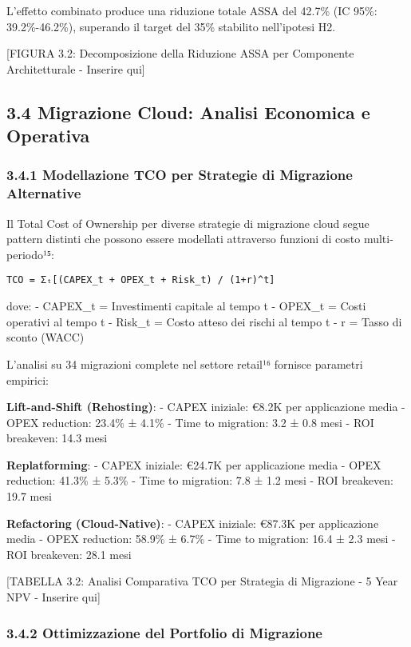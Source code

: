 \documentclass{report}
\begin{document}
L'effetto combinato produce una riduzione totale ASSA del 42.7\% (IC
95\%: 39.2\%-46.2\%), superando il target del 35\% stabilito
nell'ipotesi H2.

{[}FIGURA 3.2: Decomposizione della Riduzione ASSA per Componente
Architetturale - Inserire qui{]}

\subsection{3.4 Migrazione Cloud: Analisi Economica e
Operativa}\label{migrazione-cloud-analisi-economica-e-operativa}

\subsubsection{3.4.1 Modellazione TCO per Strategie di Migrazione
Alternative}\label{modellazione-tco-per-strategie-di-migrazione-alternative}

Il Total Cost of Ownership per diverse strategie di migrazione cloud
segue pattern distinti che possono essere modellati attraverso funzioni
di costo multi-periodo¹⁵:

\begin{verbatim}
TCO = Σₜ[(CAPEX_t + OPEX_t + Risk_t) / (1+r)^t]
\end{verbatim}

dove: - CAPEX\_t = Investimenti capitale al tempo t - OPEX\_t = Costi
operativi al tempo t - Risk\_t = Costo atteso dei rischi al tempo t - r
= Tasso di sconto (WACC)

L'analisi su 34 migrazioni complete nel settore retail¹⁶ fornisce
parametri empirici:

\textbf{Lift-and-Shift (Rehosting)}: - CAPEX iniziale: €8.2K per
applicazione media - OPEX reduction: 23.4\% ± 4.1\% - Time to migration:
3.2 ± 0.8 mesi - ROI breakeven: 14.3 mesi

\textbf{Replatforming}: - CAPEX iniziale: €24.7K per applicazione media
- OPEX reduction: 41.3\% ± 5.3\% - Time to migration: 7.8 ± 1.2 mesi -
ROI breakeven: 19.7 mesi

\textbf{Refactoring (Cloud-Native)}: - CAPEX iniziale: €87.3K per
applicazione media - OPEX reduction: 58.9\% ± 6.7\% - Time to migration:
16.4 ± 2.3 mesi - ROI breakeven: 28.1 mesi

{[}TABELLA 3.2: Analisi Comparativa TCO per Strategia di Migrazione - 5
Year NPV - Inserire qui{]}

\subsubsection{3.4.2 Ottimizzazione del Portfolio di
Migrazione}\label{ottimizzazione-del-portfolio-di-migrazione}
\end{document}
